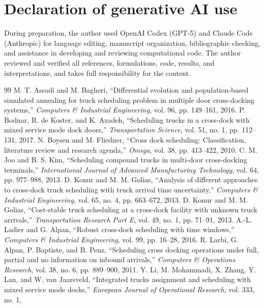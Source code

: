 \documentclass[11pt,a4paper]{article}
\begin{document}
\section*{Declaration of generative AI use}
During preparation, the author used OpenAI Codex (GPT-5) and Claude Code
(Anthropic) for language editing, manuscript organization, bibliographic
checking, and assistance in developing and reviewing computational code. The
author reviewed and verified all references, formulations, code, results, and
interpretations, and takes full responsibility for the content.

\begin{thebibliography}{99}\small
{} M. T. Assadi and M. Bagheri, ``Differential evolution and
population-based simulated annealing for truck scheduling problem in multiple door cross-docking systems,'' \emph{Computers
\& Industrial Engineering}, vol. 96, pp. 149--161, 2016.
 P. Bodnar, R. de Koster, and K. Azadeh, ``Scheduling trucks
in a cross-dock with mixed service mode dock doors,'' \emph{Transportation
Science}, vol. 51, no. 1, pp. 112--131, 2017.
 N. Boysen and M. Fliedner, ``Cross dock scheduling:
Classification, literature review and research agenda,'' \emph{Omega}, vol. 38,
pp. 413--422, 2010.
 C. M. Joo and B. S. Kim, ``Scheduling compound trucks in
multi-door cross-docking terminals,'' \emph{International Journal of Advanced
Manufacturing Technology}, vol. 64, pp. 977--988, 2013.
 D. Konur and M. M. Golias, ``Analysis of different
approaches to cross-dock truck scheduling with truck arrival time
uncertainty,'' \emph{Computers \& Industrial Engineering}, vol. 65, no. 4,
pp. 663--672, 2013.
 D. Konur and M. M. Golias, ``Cost-stable truck
scheduling at a cross-dock facility with unknown truck arrivals,''
\emph{Transportation Research Part E}, vol. 49, no. 1, pp. 71--91, 2013.
 A.-L. Ladier and G. Alpan, ``Robust cross-dock scheduling
with time windows,'' \emph{Computers \& Industrial Engineering}, vol. 99,
pp. 16--28, 2016.
 R. Larbi, G. Alpan, P. Baptiste, and B. Penz, ``Scheduling
cross docking operations under full, partial and no information on inbound
arrivals,'' \emph{Computers \& Operations Research}, vol. 38, no. 6,
pp. 889--900, 2011.
 Y. Li, M. Mohammadi, X. Zhang, Y. Lan, and W. van Jaarsveld,
``Integrated trucks assignment and scheduling with mixed service mode docks,''
\emph{European Journal of Operational Research}, vol. 333, no. 1,

\end{thebibliography}
\end{document}
